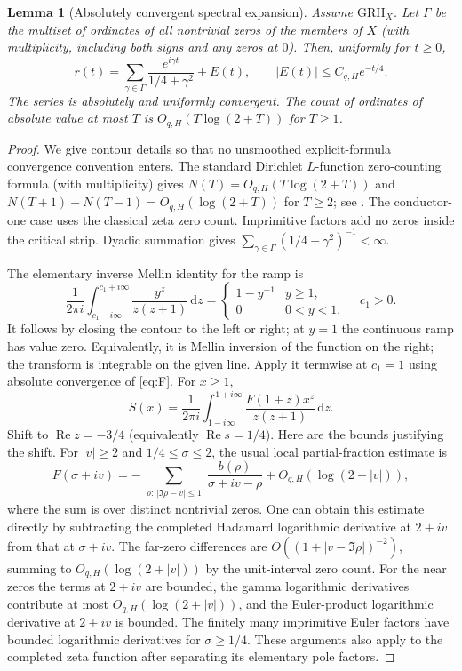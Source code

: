 \documentclass[11pt]{article}
\newtheorem{lemma}[theorem]{Lemma}
\theoremstyle{remark}\newtheorem{remark}[theorem]{Remark}
\newcommand{\Rea}{\operatorname{Re}}
\newcommand{\dd}{\,\mathrm d}
\newcommand{\GRH}{\mathrm{GRH}}
\begin{document}
\begin{lemma}[Absolutely convergent spectral expansion]\label{lem:spectral}
Assume $\GRH_X$. Let $\Gamma$ be the multiset of ordinates of all nontrivial zeros of the members of $X$ (with multiplicity, including both signs and any zeros at $0$). Then, uniformly for $t\ge0$,
\begin{equation}\label{eq:explicit}
 r(t)=\sum_{\gamma\in\Gamma}\frac{e^{i\gamma t}}{1/4+\gamma^2}+E(t),\qquad
 |E(t)|\le C_{q,H}e^{-t/4}.
\end{equation}
The series is absolutely and uniformly convergent. The count of ordinates of absolute value at most $T$ is $O_{q,H}(T\log(2+T))$ for $T\ge1$.
\end{lemma}
\begin{proof}
We give contour details so that no unsmoothed explicit-formula convergence convention enters. The standard Dirichlet $L$-function zero-counting formula (with multiplicity) gives $N(T)=O_{q,H}(T\log(2+T))$ and $N(T+1)-N(T-1)=O_{q,H}(\log(2+T))$ for $T\ge2$; see \cite{dav,bennett}. The conductor-one case uses the classical zeta zero count. Imprimitive factors add no zeros inside the critical strip. Dyadic summation gives $\sum_{\gamma\in\Gamma}(1/4+\gamma^2)^{-1}<\infty$.

The elementary inverse Mellin identity for the ramp is
\[
 \frac1{2\pi i}\int_{c_1-i\infty}^{c_1+i\infty}\frac{y^z}{z(z+1)}\dd z
 =\begin{cases}1-y^{-1}&y\ge1,\\0&0<y<1,\end{cases}\quad c_1>0.
\]
It follows by closing the contour to the left or right; at $y=1$ the continuous ramp has value zero. Equivalently, it is Mellin inversion of the function on the right; the transform is integrable on the given line. Apply it termwise at $c_1=1$ using absolute convergence of \eqref{eq:F}. For $x\ge1$,
\begin{equation}\label{eq:perron}
 S(x)=\frac1{2\pi i}\int_{1-i\infty}^{1+i\infty}
       \frac{F(1+z)x^z}{z(z+1)}\dd z.
\end{equation}
Shift to $\Rea z=-3/4$ (equivalently $\Rea s=1/4$). Here are the bounds justifying the shift. For $|v|\ge2$ and $1/4\le\sigma\le2$, the usual local partial-fraction estimate is
\[
 F(\sigma+iv)=-\sum_{\substack{\rho:\,|\Im\rho-v|\le1}}\frac{b(\rho)}{\sigma+iv-\rho}
       +O_{q,H}(\log(2+|v|)),
\]
where the sum is over distinct nontrivial zeros. One can obtain this estimate directly by subtracting the completed Hadamard logarithmic derivative at $2+iv$ from that at $\sigma+iv$. The far-zero differences are $O((1+|v-\Im\rho|)^{-2})$, summing to $O_{q,H}(\log(2+|v|))$ by the unit-interval zero count. For the near zeros the terms at $2+iv$ are bounded, the gamma logarithmic derivatives contribute at most $O_{q,H}(\log(2+|v|))$, and the Euler-product logarithmic derivative at $2+iv$ is bounded. The finitely many imprimitive Euler factors have bounded logarithmic derivatives for $\sigma\ge1/4$. These arguments also apply to the completed zeta function after separating its elementary pole factors.


\end{proof}
\end{document}
